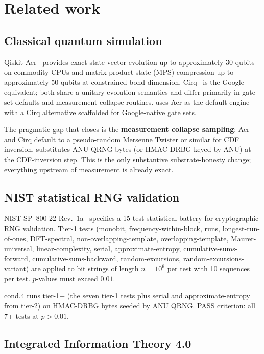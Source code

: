 \section{Related work}\label{sec:related}

\subsection{Classical quantum simulation}

Qiskit Aer~\cite{Qiskit} provides exact state-vector evolution up to
approximately 30 qubits on commodity CPUs and matrix-product-state
(MPS) compression up to approximately 50 qubits at constrained bond
dimension. Cirq~\cite{Cirq} is the Google equivalent; both share a
unitary-evolution semantics and differ primarily in gate-set defaults
and measurement collapse routines. \qmirror{} uses Aer as the default
engine with a Cirq alternative scaffolded for Google-native gate sets.

The pragmatic gap that \qmirror{} closes is the \textbf{measurement
collapse sampling}: Aer and Cirq default to a pseudo-random Mersenne
Twister or similar for CDF inversion. \qmirror{} substitutes ANU QRNG
bytes (or HMAC-DRBG keyed by ANU) at the CDF-inversion step. This is
the only substantive substrate-honesty change; everything upstream of
measurement is already exact.

\subsection{NIST statistical RNG validation}

NIST SP~800-22 Rev.~1a~\cite{NIST-SP-800-22} specifies a 15-test
statistical battery for cryptographic RNG validation. Tier-1 tests
(monobit, frequency-within-block, runs, longest-run-of-ones,
DFT-spectral, non-overlapping-template, overlapping-template,
Maurer-universal, linear-complexity, serial, approximate-entropy,
cumulative-sums-forward, cumulative-sums-backward, random-excursions,
random-excursions-variant) are applied to bit strings of length
$n = 10^{6}$ per test with 10 sequences per test. $p$-values must
exceed $0.01$.

\qmirror{} cond.4 runs tier-1+ (the seven tier-1 tests plus serial and
approximate-entropy from tier-2) on HMAC-DRBG bytes seeded by ANU
QRNG. PASS criterion: all 7+ tests at $p > 0.01$.

\subsection{Integrated Information Theory 4.0}

